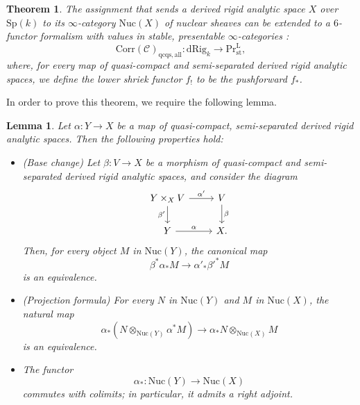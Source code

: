 \documentclass[oneside, hidelinks, 12pt, a4paper,reqno]{amsart}
\theoremstyle{plain}
\newtheorem{theorem}{Theorem}[section]
\theoremstyle{definition}
\theoremstyle{plain}
\newtheorem{lemma}[lemma]{Lemma}
\newcommand{\rL}{\mathrm L}
\newcommand{\cC}{\mathscr C}
\newcommand{\Spk}{\mathrm{Sp}(k)}
\newcommand{\cat}{$\infty$-category }
\newcommand{\cates}{$\infty$-categories }
\newcommand{\LPr}{\mathrm{Pr}^\rL}
\newcommand{\Nuc}{\mathrm{Nuc}}
\begin{document}
\begin{theorem}\label{thm: 6 functor for nuclear modules in rigid geometry}
    The assignment that sends a derived rigid analytic space $X$ over $\Spk$ to its \cat $\Nuc(X)$ of nuclear sheaves can be extended to a $6$-functor formalism with values in stable, presentable \cates:
    \[
    \mathrm{Corr}(\cC)_{\mathrm{qcqs}, \mathrm{all}}\colon \mathrm{dRig}_{k} \to \LPr_{\mathrm{st}},
    \]
    where, for every map of quasi-compact and semi-separated derived rigid analytic spaces, we define the lower shriek functor $f_{!}$ to be the pushforward $f_{\ast}$.
\end{theorem}

In order to prove this theorem, we require the following lemma.

\begin{lemma}\label{lem: base change and projection}
    Let $\alpha \colon Y \to X$ be a map of quasi-compact, semi-separated derived rigid analytic spaces. Then the following properties hold:
    \begin{itemize}
        \item[1] (Base change) Let $\beta \colon V \to X$ be a morphism of quasi-compact and semi-separated derived rigid analytic spaces, and consider the diagram
        \[
        \begin{tikzcd}
            Y \times_X V \arrow[r, "\alpha'"] \arrow[d, "\beta'"'] 
            & V \arrow[d, "\beta"] \\
            Y \arrow[r, "\alpha"] 
            & X.
        \end{tikzcd}
        \]
        Then, for every object $M$ in $\Nuc(Y)$, the canonical map 
        \begin{equation}\label{eq: base change}
            \beta^* \alpha_* M \longrightarrow \alpha'_* \beta'^* M
        \end{equation}
        is an equivalence.
        
        \item[2] (Projection formula) For every $N$ in $\Nuc(Y)$ and $M$ in $\Nuc(X)$, the natural map 
        \begin{equation}\label{eq: projection formula}
            \alpha_{\ast}(N \otimes_{\Nuc(Y)} \alpha^{\ast}M) \longrightarrow \alpha_{\ast}N \otimes_{\Nuc(X)}M
        \end{equation} 
        is an equivalence.
        
        \item[3] The functor
        \[
        \alpha_{\ast} \colon \Nuc(Y) \to \Nuc(X)
        \]
        commutes with colimits; in particular, it admits a right adjoint.
    \end{itemize}
\end{lemma}
\end{document}
